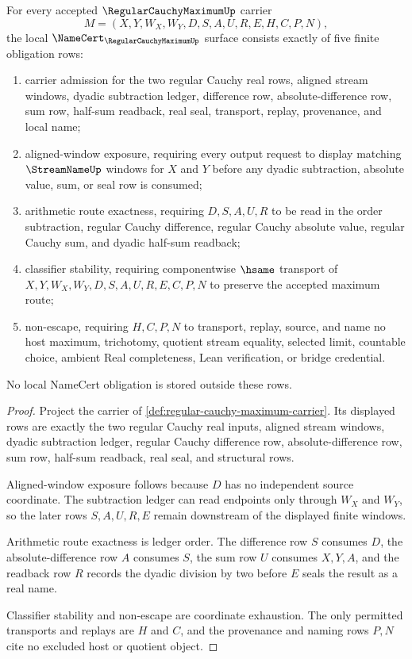 \begin{theorem}\label{thm:regular-cauchy-maximum-namecert-obligations}
For every accepted $\RegularCauchyMaximumUp$ carrier
$$
M=(X,Y,W_X,W_Y,D,S,A,U,R,E,H,C,P,N),
$$
the local $\NameCert_{\RegularCauchyMaximumUp}$ surface consists exactly of five finite obligation rows:
\begin{enumerate}
\item carrier admission for the two regular Cauchy real rows, aligned stream windows, dyadic subtraction ledger, difference row, absolute-difference row, sum row, half-sum readback, real seal, transport, replay, provenance, and local name;
\item aligned-window exposure, requiring every output request to display matching $\StreamNameUp$ windows for $X$ and $Y$ before any dyadic subtraction, absolute value, sum, or seal row is consumed;
\item arithmetic route exactness, requiring $D,S,A,U,R$ to be read in the order subtraction, regular Cauchy difference, regular Cauchy absolute value, regular Cauchy sum, and dyadic half-sum readback;
\item classifier stability, requiring componentwise $\hsame$ transport of $X,Y,W_X,W_Y,D,S,A,U,R,E,C,P,N$ to preserve the accepted maximum route;
\item non-escape, requiring $H,C,P,N$ to transport, replay, source, and name no host maximum, trichotomy, quotient stream equality, selected limit, countable choice, ambient Real completeness, Lean verification, or bridge credential.
\end{enumerate}
No local NameCert obligation is stored outside these rows.
\end{theorem}
\begin{proof}
Project the carrier of \autoref{def:regular-cauchy-maximum-carrier}. Its displayed rows are exactly the two regular Cauchy real inputs, aligned stream windows, dyadic subtraction ledger, regular Cauchy difference row, absolute-difference row, sum row, half-sum readback, real seal, and structural rows.

Aligned-window exposure follows because $D$ has no independent source coordinate. The subtraction ledger can read endpoints only through $W_X$ and $W_Y$, so the later rows $S,A,U,R,E$ remain downstream of the displayed finite windows.

Arithmetic route exactness is ledger order. The difference row $S$ consumes $D$, the absolute-difference row $A$ consumes $S$, the sum row $U$ consumes $X,Y,A$, and the readback row $R$ records the dyadic division by two before $E$ seals the result as a real name.

Classifier stability and non-escape are coordinate exhaustion. The only permitted transports and replays are $H$ and $C$, and the provenance and naming rows $P,N$ cite no excluded host or quotient object.
\end{proof}

